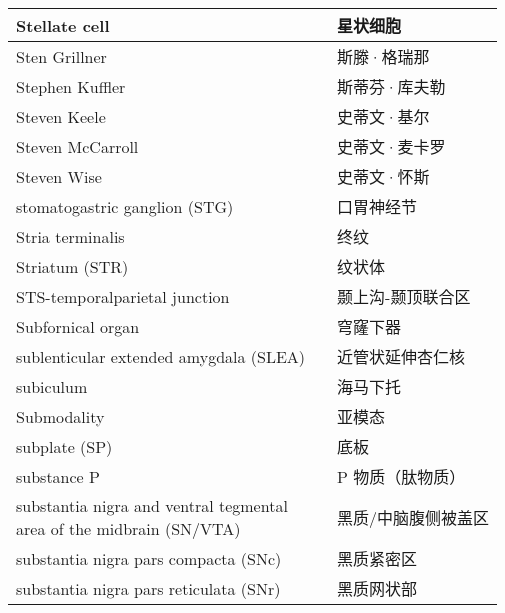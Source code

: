 \begin{longtable}{lll}
	\midrule
	Stellate cell   && 星状细胞 \\
	
	\midrule
	Sten Grillner   && 斯滕·格瑞那 \\
	
	\midrule
	Stephen Kuffler   && 斯蒂芬·库夫勒 \\
	
	\midrule
	Steven Keele   && 史蒂文·基尔 \\
	
	\midrule
	Steven McCarroll   && 史蒂文·麦卡罗 \\
	
	\midrule
	Steven Wise   && 史蒂文·怀斯 \\
	
	\midrule
	stomatogastric ganglion  (STG)  && 口胃神经节 \\
	
	\midrule
	Stria terminalis  && 终纹 \\
	
	\midrule
	Striatum (STR)  && 纹状体 \\
	
	\midrule
	STS-temporalparietal junction   && 颞上沟-颞顶联合区 \\
	
	\midrule
	Subfornical organ   && 穹窿下器 \\
	
	\midrule
	sublenticular extended amygdala (SLEA)   && 近管状延伸杏仁核 \\
	
	\midrule
	subiculum   && 海马下托 \\
	
	\midrule
	Submodality   && 亚模态 \\
	
	\midrule
	subplate (SP)   && 底板 \\
	
	\midrule
	substance P   && P 物质（肽物质） \\
	
	\midrule
	\makecell[l]{substantia nigra and ventral tegmental \\area of the midbrain (SN/VTA)}   && 黑质/中脑腹侧被盖区 \\
	
	\midrule
	substantia nigra pars compacta (SNc)  && 黑质紧密区 \\
	
	\midrule
	substantia nigra pars reticulata (SNr)  && 黑质网状部 \\
	

\end{longtable}
